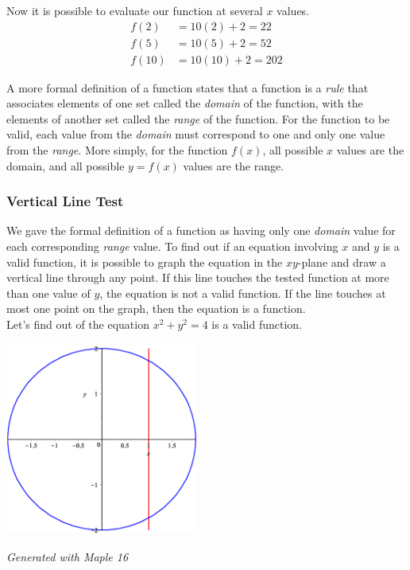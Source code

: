 \documentclass[oneside]{article}
\begin{document}
Now it is possible to evaluate our function at several $x$ values. 
\begin{align*}
	f(2) & = 10(2) + 2 = 22 \\
	f(5) & = 10(5) + 2 = 52 \\
	f(10) & = 10(10) + 2 = 202
\end{align*}

A more formal definition of a function states that a function is a \textit{rule} that associates elements of one set called the \textit{domain} of the function, with the elements of another set called the \textit{range} of the function. For the function to be valid, each value from the \textit{domain} must correspond to one and only one value from the \textit{range}. More simply, for the function $f(x)$, all possible $x$ values are the domain, and all possible $y = f(x)$ values are the range.

\subsubsection{Vertical Line Test}
We gave the formal definition of a function as having only one \textit{domain} value for each corresponding \textit{range} value. To find out if an equation involving $x$ and $y$ is a valid function, it is possible to graph the equation in the $xy$-plane and draw a vertical line through any point. If this line touches the tested function at more than one value of $y$, the equation is not a valid function. If the line touches at most one point on the graph, then the equation is a function. \\

Let's find out of the equation $x^2 + y^2 = 4$ is a valid function. 

\begin{center}
\includegraphics[width=2.5in, height=2.5in]{img/vert_line_test.eps}

\small \textit{Generated with Maple 16} \\
\end{center}
\end{document}
